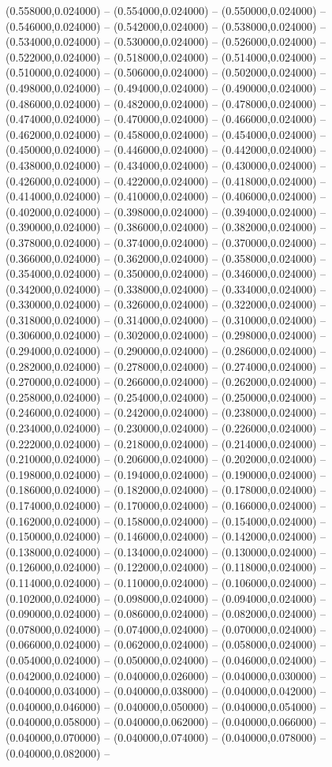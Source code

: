 (0.558000,0.024000) -- (0.554000,0.024000) -- (0.550000,0.024000) -- (0.546000,0.024000) -- (0.542000,0.024000) -- (0.538000,0.024000) -- (0.534000,0.024000) -- (0.530000,0.024000) -- (0.526000,0.024000) -- (0.522000,0.024000) -- (0.518000,0.024000) -- (0.514000,0.024000) -- (0.510000,0.024000) -- (0.506000,0.024000) -- (0.502000,0.024000) -- (0.498000,0.024000) -- (0.494000,0.024000) -- (0.490000,0.024000) -- (0.486000,0.024000) -- (0.482000,0.024000) -- (0.478000,0.024000) -- (0.474000,0.024000) -- (0.470000,0.024000) -- (0.466000,0.024000) -- (0.462000,0.024000) -- (0.458000,0.024000) -- (0.454000,0.024000) -- (0.450000,0.024000) -- (0.446000,0.024000) -- (0.442000,0.024000) -- (0.438000,0.024000) -- (0.434000,0.024000) -- (0.430000,0.024000) -- (0.426000,0.024000) -- (0.422000,0.024000) -- (0.418000,0.024000) -- (0.414000,0.024000) -- (0.410000,0.024000) -- (0.406000,0.024000) -- (0.402000,0.024000) -- (0.398000,0.024000) -- (0.394000,0.024000) -- (0.390000,0.024000) -- (0.386000,0.024000) -- (0.382000,0.024000) -- (0.378000,0.024000) -- (0.374000,0.024000) -- (0.370000,0.024000) -- (0.366000,0.024000) -- (0.362000,0.024000) -- (0.358000,0.024000) -- (0.354000,0.024000) -- (0.350000,0.024000) -- (0.346000,0.024000) -- (0.342000,0.024000) -- (0.338000,0.024000) -- (0.334000,0.024000) -- (0.330000,0.024000) -- (0.326000,0.024000) -- (0.322000,0.024000) -- (0.318000,0.024000) -- (0.314000,0.024000) -- (0.310000,0.024000) -- (0.306000,0.024000) -- (0.302000,0.024000) -- (0.298000,0.024000) -- (0.294000,0.024000) -- (0.290000,0.024000) -- (0.286000,0.024000) -- (0.282000,0.024000) -- (0.278000,0.024000) -- (0.274000,0.024000) -- (0.270000,0.024000) -- (0.266000,0.024000) -- (0.262000,0.024000) -- (0.258000,0.024000) -- (0.254000,0.024000) -- (0.250000,0.024000) -- (0.246000,0.024000) -- (0.242000,0.024000) -- (0.238000,0.024000) -- (0.234000,0.024000) -- (0.230000,0.024000) -- (0.226000,0.024000) -- (0.222000,0.024000) -- (0.218000,0.024000) -- (0.214000,0.024000) -- (0.210000,0.024000) -- (0.206000,0.024000) -- (0.202000,0.024000) -- (0.198000,0.024000) -- (0.194000,0.024000) -- (0.190000,0.024000) -- (0.186000,0.024000) -- (0.182000,0.024000) -- (0.178000,0.024000) -- (0.174000,0.024000) -- (0.170000,0.024000) -- (0.166000,0.024000) -- (0.162000,0.024000) -- (0.158000,0.024000) -- (0.154000,0.024000) -- (0.150000,0.024000) -- (0.146000,0.024000) -- (0.142000,0.024000) -- (0.138000,0.024000) -- (0.134000,0.024000) -- (0.130000,0.024000) -- (0.126000,0.024000) -- (0.122000,0.024000) -- (0.118000,0.024000) -- (0.114000,0.024000) -- (0.110000,0.024000) -- (0.106000,0.024000) -- (0.102000,0.024000) -- (0.098000,0.024000) -- (0.094000,0.024000) -- (0.090000,0.024000) -- (0.086000,0.024000) -- (0.082000,0.024000) -- (0.078000,0.024000) -- (0.074000,0.024000) -- (0.070000,0.024000) -- (0.066000,0.024000) -- (0.062000,0.024000) -- (0.058000,0.024000) -- (0.054000,0.024000) -- (0.050000,0.024000) -- (0.046000,0.024000) -- (0.042000,0.024000) -- (0.040000,0.026000) -- (0.040000,0.030000) -- (0.040000,0.034000) -- (0.040000,0.038000) -- (0.040000,0.042000) -- (0.040000,0.046000) -- (0.040000,0.050000) -- (0.040000,0.054000) -- (0.040000,0.058000) -- (0.040000,0.062000) -- (0.040000,0.066000) -- (0.040000,0.070000) -- (0.040000,0.074000) -- (0.040000,0.078000) -- (0.040000,0.082000) -- 